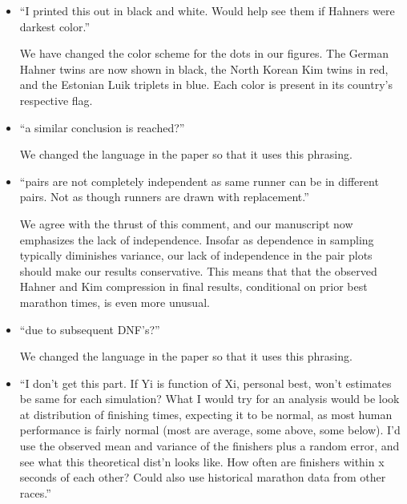 \documentclass[12pt]{article}
\begin{document}
\begin{itemize}





\item ``I printed this out in black and white. Would help see them if
  Hahners were darkest color.''

  We have changed the color scheme for the dots in our figures.  The
  German Hahner twins are now shown in black, the North Korean Kim
  twins in red, and the Estonian Luik triplets in blue.  Each color is
  present in its country's respective flag.
  
\item ``a similar conclusion is reached?''
  
  We changed the language in the paper so that it uses this phrasing.
  
\item ``pairs are not completely independent as same runner can be in
  different pairs. Not as though runners are drawn with replacement.''

  We agree with the thrust of this comment, and our manuscript now
  emphasizes the lack of independence.  Insofar as dependence in
  sampling typically diminishes variance, our lack of independence in
  the pair plots should make our results conservative. This means that
  that the observed Hahner and Kim compression in final results,
  conditional on prior best marathon times, is even more unusual.

\item ``due to subsequent DNF's?''

  We changed the language in the paper so that it uses this phrasing.
  
\item ``I don't get this part. If Yi is function of Xi, personal best,
  won't estimates be same for each simulation?  What I would try for
  an analysis would be look at distribution of finishing times,
  expecting it to be normal, as most human performance is fairly
  normal (most are average, some above, some below). I'd use the
  observed mean and variance of the finishers plus a random error, and
  see what this theoretical dist'n looks like. How often are finishers
  within x seconds of each other? Could also use historical marathon
  data from other races.''


\end{itemize}
\end{document}
